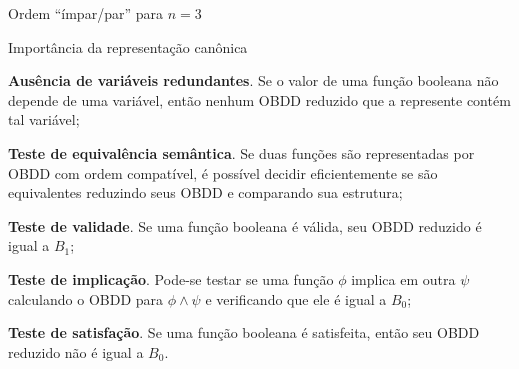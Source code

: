 \expandafter\documentclass\expandafter[table, usenames, svgnames, dvipsnames,14pt, \classopts]{beamer}
\begin{document}
\begin{frame}{Ordem ``ímpar/par'' para $n=3$}
\begin{figure}

    \end{figure}

\end{frame}

\begin{frame}{Importância da representação canônica}

    \scriptsize

    \begin{outline}
        \1 \textbf{Ausência de variáveis redundantes}. Se o valor de uma função booleana não depende de uma variável, então nenhum OBDD reduzido que a represente contém tal variável;
        
        \vspace{1em}
        
        \1 \textbf{Teste de equivalência semântica}. Se duas funções são representadas por OBDD com ordem compatível, é possível decidir eficientemente se são equivalentes reduzindo seus OBDD e comparando sua estrutura;
            
        \vspace{1em}
        
        \1 \textbf{Teste de validade}. Se uma função booleana é válida, seu OBDD reduzido é igual a $B_1$;
        
        \vspace{1em}
        
        \1 \textbf{Teste de implicação}. Pode-se testar se uma função $\phi$ implica em outra $\psi$ calculando o OBDD para $\phi \land \psi$ e verificando que ele é igual a $B_0$;
        
        \vspace{1em}
        
        \1 \textbf{Teste de satisfação}. Se uma função booleana é satisfeita, então seu OBDD reduzido não é igual a $B_0$.
    \end{outline}

\end{frame}
\end{document}
